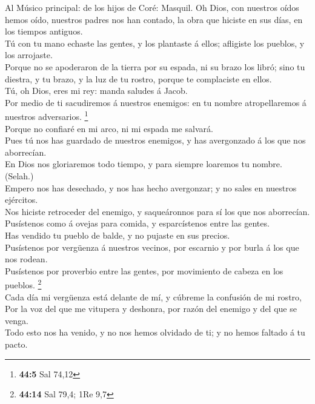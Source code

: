  Al Músico principal: de los hijos de Coré: Masquil. Oh
Dios, con nuestros oídos hemos oído, nuestros padres nos han contado, la
obra que hiciste en sus días, en los tiempos antiguos.\\
 Tú con tu mano echaste las gentes, y los plantaste á
ellos; afligiste los pueblos, y los arrojaste.\\
 Porque no se apoderaron de la tierra por su espada, ni su
brazo los libró; sino tu diestra, y tu brazo, y la luz de tu rostro,
porque te complaciste en ellos.\\
 Tú, oh Dios, eres mi rey: manda saludes á Jacob.\\
 Por medio de ti sacudiremos á nuestros enemigos: en tu
nombre atropellaremos á nuestros adversarios. \footnote{\textbf{44:5}
  Sal 74,12}\\
 Porque no confiaré en mi arco, ni mi espada me salvará.\\
 Pues tú nos has guardado de nuestros enemigos, y has
avergonzado á los que nos aborrecían.\\
 En Dios nos gloriaremos todo tiempo, y para siempre
loaremos tu nombre. (Selah.)\\
 Empero nos has desechado, y nos has hecho avergonzar; y
no sales en nuestros ejércitos.\\
 Nos hiciste retroceder del enemigo, y saqueáronnos para
sí los que nos aborrecían.\\
 Pusístenos como á ovejas para comida, y esparcístenos
entre las gentes.\\
 Has vendido tu pueblo de balde, y no pujaste en sus
precios.\\
 Pusístenos por vergüenza á nuestros vecinos, por
escarnio y por burla á los que nos rodean.\\
 Pusístenos por proverbio entre las gentes, por
movimiento de cabeza en los pueblos. \footnote{\textbf{44:14} Sal 79,4;
  1Re 9,7}\\
 Cada día mi vergüenza está delante de mí, y cúbreme la
confusión de mi rostro,\\
 Por la voz del que me vitupera y deshonra, por razón del
enemigo y del que se venga.\\
 Todo esto nos ha venido, y no nos hemos olvidado de ti;
y no hemos faltado á tu pacto.\\
